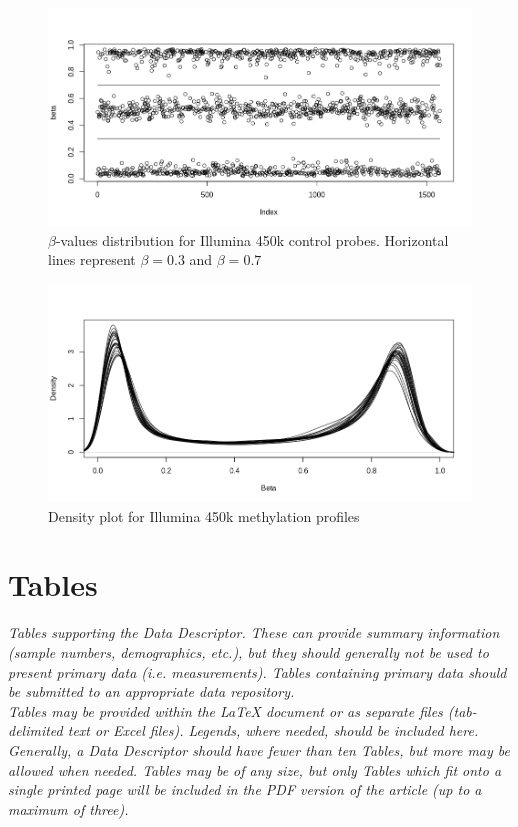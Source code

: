 \documentclass[english]{article}
\begin{document}
\begin{figure}
    \centering
    \includegraphics[width=\textwidth]{img/beta_snp65.png}
    \caption{$\beta$-values distribution for Illumina 450k control probes. Horizontal lines represent $\beta=0.3$ and $\beta=0.7$}
    \label{fig: beta-values distribution for Illumina 450k control probes}
\end{figure}
\begin{figure}
    \centering
    \includegraphics[width=\textwidth]{img/densityPlot450k.png}
    \caption{Density plot for Illumina 450k methylation profiles}
    \label{fig: Density plot for Illumina 450k methylation profiles}
\end{figure}


\section*{Tables}

\textit{Tables supporting the Data Descriptor. These can provide summary information
(sample numbers, demographics, etc.), but they should generally not
be used to present primary data (i.e. measurements). Tables containing
primary data should be submitted to an appropriate data repository. 
\\
Tables may be provided within the \LaTeX{} document or as separate
files (tab-delimited text or Excel files). Legends, where needed,
should be included here. Generally, a Data Descriptor should have
fewer than ten Tables, but more may be allowed when needed. Tables
may be of any size, but only Tables which fit onto a single printed
page will be included in the PDF version of the article (up to a maximum
of three).}
\end{document}
